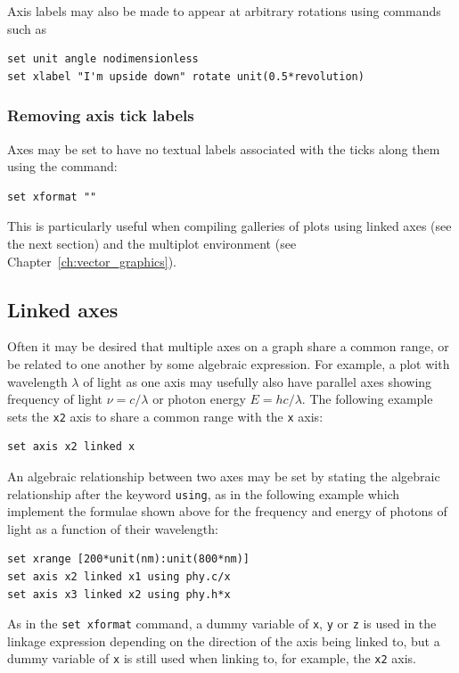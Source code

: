 Axis labels may also be made to appear at arbitrary rotations using commands such as
\begin{verbatim}
set unit angle nodimensionless
set xlabel "I'm upside down" rotate unit(0.5*revolution)
\end{verbatim}

\subsubsection{Removing axis tick labels}

Axes may be set to have no textual labels associated with the ticks along them
using the command:
\begin{verbatim}
set xformat ""
\end{verbatim}
This is particularly useful when compiling galleries of plots using linked axes
(see the next section) and the multiplot environment (see
Chapter~\ref{ch:vector_graphics}).

\subsection{Linked axes}
\label{sec:linked_axes}

Often it may be desired that multiple axes on a graph share a common range, or
be related to one another by some algebraic expression. For example, a plot
with wavelength $\lambda$ of light as one axis may usefully also have parallel
axes showing frequency of light $\nu=c/\lambda$ or photon energy
$E=hc/\lambda$. The following example sets the {\tt x2} axis to share a common
range with the {\tt x} axis:
\begin{verbatim}
set axis x2 linked x
\end{verbatim}
An algebraic relationship between two axes may be set by stating the algebraic
relationship after the keyword {\tt using}, as in the following example which
implement the formulae shown above for the frequency and energy of photons of
light as a function of their wavelength:
\begin{verbatim}
set xrange [200*unit(nm):unit(800*nm)]
set axis x2 linked x1 using phy.c/x
set axis x3 linked x2 using phy.h*x
\end{verbatim}
As in the {\tt set xformat} command, a dummy variable of {\tt x}, {\tt y} or
{\tt z} is used in the linkage expression depending on the direction of the
axis being linked to, but a dummy variable of {\tt x} is still used when
linking to, for example, the {\tt x2} axis.

